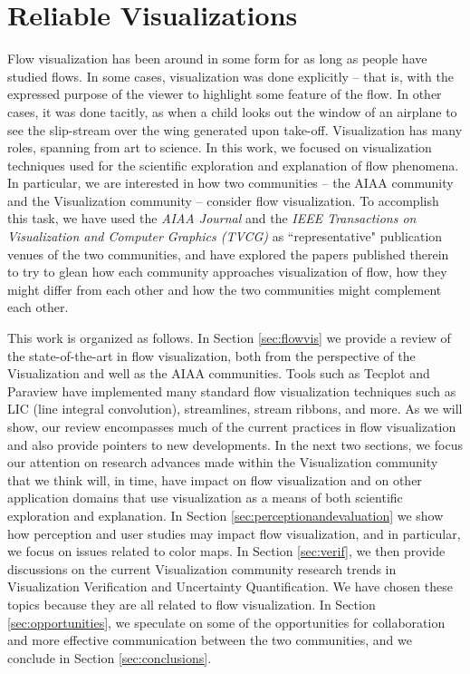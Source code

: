 \chapter{Reliable Visualizations}
\label{chap:aiaa}

Flow visualization has been around in some form for as long as people have studied flows.  In some
cases, visualization was done explicitly -- that is, with the expressed purpose of the viewer to highlight
some feature of the flow.  In other cases, it was done tacitly, as when a child looks out the window
of an airplane to see the slip-stream over the wing generated upon take-off.  Visualization has
many roles, spanning from art to science.  In this work, we focused on visualization techniques
used for the scientific exploration and explanation of flow phenomena.  In particular, we are interested
in how two communities -- the AIAA community and the Visualization community -- consider
flow visualization.  To accomplish this task, we have used the {\em AIAA Journal} and the
{\em IEEE Transactions on Visualization and Computer Graphics (TVCG)} as ``representative" publication
venues of the two communities, and have explored the papers published therein to try to 
glean how each community approaches visualization of flow, how they might differ from each other 
and how the two communities might complement each other. 

This work is organized as follows.  In Section \ref{sec:flowvis} we provide a review of the state-of-the-art
in flow visualization, both from the perspective of the Visualization and well as the AIAA communities. 
%
Tools such as Tecplot\cite{amtec1996tecplot} and Paraview\cite{squillacote2007paraview} have implemented many 
standard flow visualization techniques such as LIC (line integral convolution), streamlines, stream ribbons, and more. 
As we will show, our review encompasses much of the current practices in 
flow visualization and also provide pointers to new developments. 
%
In the next two sections, we focus our attention on research advances made within the Visualization 
community that we think will, in time, have impact on flow visualization and on other application domains
that use visualization as a means of both scientific exploration and explanation.  
In Section \ref{sec:perceptionandevaluation} we show how perception and user studies may impact flow visualization, and
in particular, we focus on
issues related to color maps.  In Section \ref{sec:verif}, we then provide
discussions on the current Visualization community research trends in Visualization Verification 
and Uncertainty Quantification.  We have chosen these topics because they are all related to flow visualization.
In Section \ref{sec:opportunities}, we speculate on some of the opportunities for collaboration and
more effective communication between the two communities, and we conclude in Section
\ref{sec:conclusions}.

